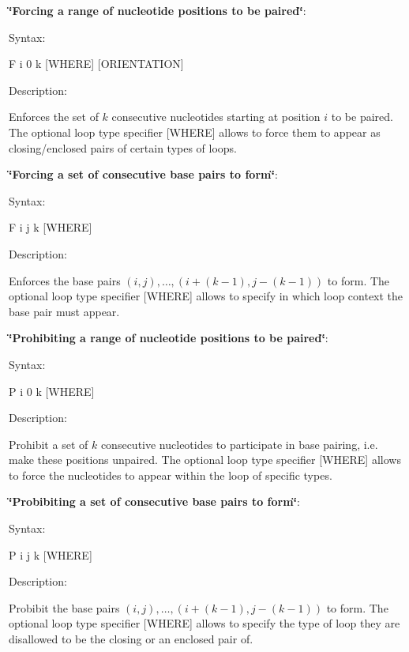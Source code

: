 \begin{DoxyEnumerate}
\item {\bfseries \char`\"{}\-Forcing a range of nucleotide positions to be paired\char`\"{}}\-:\par
 Syntax\-:
\begin{DoxyCode}
F i 0 k [WHERE] [ORIENTATION] 
\end{DoxyCode}
\par
 Description\-:\par
 Enforces the set of $ k $ consecutive nucleotides starting at position $ i $ to be paired. The optional loop type specifier {\ttfamily }\mbox{[}W\-H\-E\-R\-E\mbox{]} allows to force them to appear as closing/enclosed pairs of certain types of loops.
\item {\bfseries \char`\"{}\-Forcing a set of consecutive base pairs to form\char`\"{}}\-:\par
 Syntax\-:\begin{DoxyVerb}F i j k [WHERE] \end{DoxyVerb}
\par
 Description\-:\par
 Enforces the base pairs $ (i,j), \ldots, (i+(k-1), j-(k-1)) $ to form. The optional loop type specifier {\ttfamily }\mbox{[}W\-H\-E\-R\-E\mbox{]} allows to specify in which loop context the base pair must appear.
\item {\bfseries \char`\"{}\-Prohibiting a range of nucleotide positions to be paired\char`\"{}}\-:\par
 Syntax\-:\begin{DoxyVerb}P i 0 k [WHERE] \end{DoxyVerb}
\par
 Description\-:\par
 Prohibit a set of $ k $ consecutive nucleotides to participate in base pairing, i.\-e. make these positions unpaired. The optional loop type specifier {\ttfamily }\mbox{[}W\-H\-E\-R\-E\mbox{]} allows to force the nucleotides to appear within the loop of specific types.
\item {\bfseries \char`\"{}\-Probibiting a set of consecutive base pairs to form\char`\"{}}\-:\par
 Syntax\-:\begin{DoxyVerb}P i j k [WHERE] \end{DoxyVerb}
\par
 Description\-:\par
 Probibit the base pairs $ (i,j), \ldots, (i+(k-1), j-(k-1)) $ to form. The optional loop type specifier {\ttfamily }\mbox{[}W\-H\-E\-R\-E\mbox{]} allows to specify the type of loop they are disallowed to be the closing or an enclosed pair of.

\end{DoxyEnumerate}
